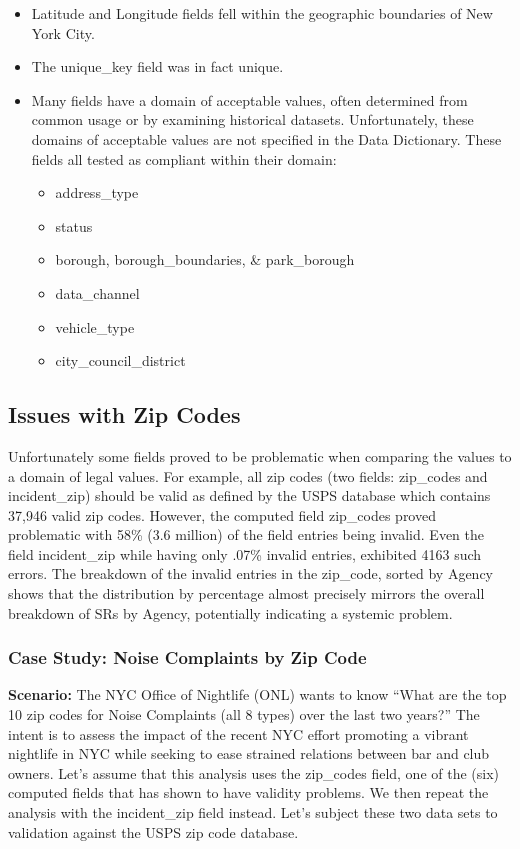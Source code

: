 \documentclass[12pt, titlepage]{article}
\begin{document}
\begin{itemize}
	\item Latitude and Longitude fields fell within the geographic 
	boundaries of New York City. 
	\item The unique\_key field was in fact unique.
	\item Many fields have a domain of acceptable values, often 
	determined from common usage or by examining historical 
	datasets. Unfortunately, these domains of acceptable 
	values are not specified in the Data Dictionary. These fields all tested as 
	compliant within their domain:
	\begin{itemize}
		\item address\_type
		\item status
		\item borough, borough\_boundaries, \& park\_borough 
		\item data\_channel
		\item vehicle\_type
		\item city\_council\_district
	\end{itemize}	
\end{itemize}

\subsection{Issues with Zip Codes}
\label{sec:zipcodesissues}
 Unfortunately some fields proved to be  problematic when comparing 
 the values to a domain of legal values. For example, all zip codes 
 (two fields: zip\_codes and incident\_zip) should be valid as defined 
 by the USPS database which contains 37,946 valid zip codes. However,
 the computed field zip\_codes proved problematic with 
58\% (3.6 million) of the field entries being invalid. Even the 
field incident\_zip while having only .07\% invalid entries, exhibited
4163 such errors. The breakdown of the invalid entries in the zip\_code, sorted by 
Agency shows that the distribution by percentage almost precisely 
mirrors the overall breakdown of SRs by Agency, potentially indicating
a systemic problem.
	
\subsubsection{Case Study: Noise Complaints by Zip Code}
\label{sec:case-study-zip-codes}
\textbf{Scenario:} The NYC Office of Nightlife (ONL) wants to 
know ``What are the top 10 zip codes for Noise Complaints (all 8 types) 
over the last two years?'' The intent is to assess the impact of the 
recent NYC effort promoting a vibrant nightlife 
in NYC while seeking to ease strained relations 
between bar and club owners. Let's assume that this analysis 
uses the zip\_codes field, one of the (six) 
computed fields that has shown to have validity problems. 
We then repeat the analysis with the incident\_zip field instead. Let's 
subject these two data sets to validation against the USPS zip code database.
	 
\end{document}
